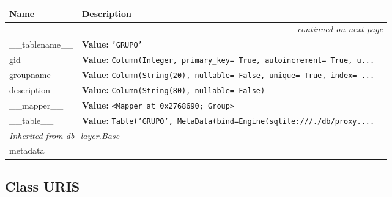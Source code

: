     \vspace{-1cm}
\hspace{\varindent}\begin{longtable}{|p{\varnamewidth}|p{\vardescrwidth}|l}
\cline{1-2}
\cline{1-2} \centering \textbf{Name} & \centering \textbf{Description}& \\
\cline{1-2}
\endhead\cline{1-2}\multicolumn{3}{r}{\small\textit{continued on next page}}\\\endfoot\cline{1-2}
\endlastfoot\raggedright \_\-\_\-t\-a\-b\-l\-e\-n\-a\-m\-e\-\_\-\_\- & \raggedright \textbf{Value:} 
{\tt \texttt{'}\texttt{GRUPO}\texttt{'}}&\\
\cline{1-2}
\raggedright g\-i\-d\- & \raggedright \textbf{Value:} 
{\tt Column(Integer, primary\_key= True, autoincrement= True, u\texttt{...}}&\\
\cline{1-2}
\raggedright g\-r\-o\-u\-p\-n\-a\-m\-e\- & \raggedright \textbf{Value:} 
{\tt Column(String(20), nullable= False, unique= True, index= \texttt{...}}&\\
\cline{1-2}
\raggedright d\-e\-s\-c\-r\-i\-p\-t\-i\-o\-n\- & \raggedright \textbf{Value:} 
{\tt Column(String(80), nullable= False)}&\\
\cline{1-2}
\raggedright \_\-\_\-m\-a\-p\-p\-e\-r\-\_\-\_\- & \raggedright \textbf{Value:} 
{\tt {\textless}Mapper at 0x2768690; Group{\textgreater}}&\\
\cline{1-2}
\raggedright \_\-\_\-t\-a\-b\-l\-e\-\_\-\_\- & \raggedright \textbf{Value:} 
{\tt Table('GRUPO', MetaData(bind=Engine(sqlite:///./db/proxy.\texttt{...}}&\\
\cline{1-2}
\multicolumn{2}{|l|}{\textit{Inherited from db\_layer.Base}}\\
\multicolumn{2}{|p{\varwidth}|}{\raggedright metadata}\\
\cline{1-2}
\end{longtable}



\subsection{Class URIS}

